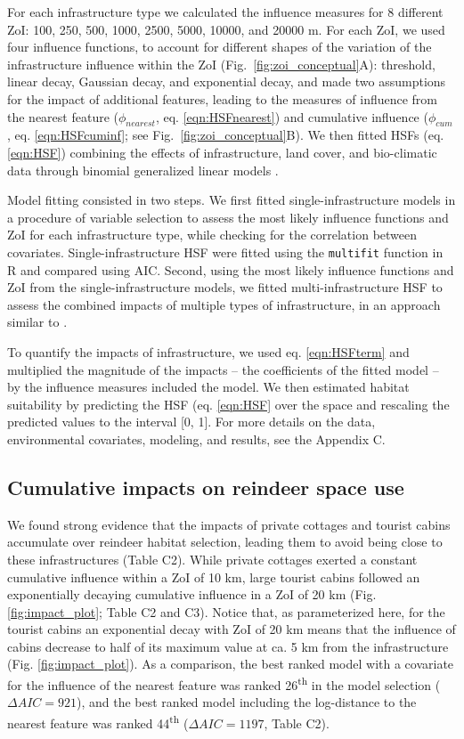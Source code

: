 \documentclass[titlepage]{article}
\begin{document}
For each infrastructure type we calculated the influence measures for 8 different ZoI: 100, 250, 500, 1000, 2500, 5000, 10000, and 20000 m. For each ZoI, we used four influence functions, to account for different shapes of the variation of the infrastructure influence within the ZoI (Fig.~\ref{fig:zoi_conceptual}A): threshold, linear decay, Gaussian decay, and exponential decay, and made two assumptions for the impact of additional features, leading to the measures of influence from the nearest feature ($\phi_{nearest}$, eq. \ref{eqn:HSFnearest}) and cumulative influence ($\phi_{cum}$, eq. \ref{eqn:HSFcuminf}; see Fig.~\ref{fig:zoi_conceptual}B). We then fitted HSFs (eq. \ref{eqn:HSF}) combining the effects of infrastructure, land cover, and bio-climatic data through binomial generalized linear models \citep{fieberg_how_2021}. 

Model fitting consisted in two steps. We first fitted single-infrastructure models in a procedure of variable selection \citep{burnham_model_2002} to assess the most likely influence functions and ZoI for each infrastructure type, while checking for the correlation between covariates. Single-infrastructure HSF were fitted using the \verb|multifit| function in R \citep{huais_multifit_2018} and compared using AIC. Second, using the most likely influence functions and ZoI from the single-infrastructure models, we fitted multi-infrastructure HSF to assess the combined impacts of multiple types of infrastructure, in an approach similar to \citet{laforge_process-focussed_2015}. 

To quantify the impacts of infrastructure, we used eq. \ref{eqn:HSFterm} and multiplied the magnitude of the impacts -- the coefficients of the fitted model -- by the influence measures included the model. We then estimated habitat suitability by predicting the HSF (eq. \ref{eqn:HSF} over the space and rescaling the predicted values to the interval [0, 1]. For more details on the data, environmental covariates, modeling, and results, see the Appendix C.

\subsection{Cumulative impacts on reindeer space use}

We found strong evidence that the impacts of private cottages and tourist cabins accumulate over reindeer habitat selection, leading them to avoid being close to these infrastructures (Table C2). While private cottages exerted a constant cumulative influence within a ZoI of 10 km, large tourist cabins followed an exponentially decaying cumulative influence in a ZoI of 20 km (Fig. \ref{fig:impact_plot}; Table C2 and C3). Notice that, as parameterized here, for the tourist cabins an exponential decay with ZoI of 20 km means
that the influence of cabins decrease to half of its maximum value
at ca. 5 km from the infrastructure (Fig. \ref{fig:impact_plot}). As a comparison, the best ranked model with a covariate for the influence of the nearest feature was ranked 26\textsuperscript{th} in the model selection ($\Delta AIC = 921$), and the best ranked model including the log-distance to the nearest feature was ranked 44\textsuperscript{th} ($\Delta AIC = 1197$, Table C2).
\end{document}
